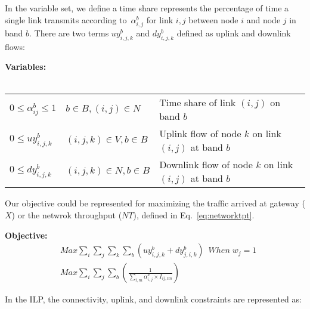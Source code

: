 In the variable set, we define a time share represents 
the percentage of time a single link transmits according 
to~$\alpha_{i,j}^b$ for link $i,j$ between node $i$ and 
node $j$ in band $b$. There are two terms $uy_{i,j,k}^{b}$
and $dy_{i,j,k}^{b}$ defined as uplink and downlink flows:

\noindent
{\bf Variables:}\\
\\
\begin{tabular}{llp{3cm}}
$0\le \alpha_{ij}^b \le 1$  & $b\in B, (i,j) \in N$ & 
Time share of link $(i,j)$ on band $b$\\ 
$0\le uy_{i,j,k}^b$ & $(i,j,k) \in V, b \in B$ & 
Uplink flow of node $k$ on link $(i,j)$ at band $b$ \\ 
$0\le dy_{i,j,k}^b$ & $(i,j,k) \in N, b \in B$ & 
Downlink flow of node $k$ on link $(i,j)$ at band $b$ \\ 
\end{tabular}

Our objective could be represented for  
maximizing the traffic arrived at gateway ($X$)
or the netwrok throughput ($NT$), defined in 
Eq.~\ref{eq:networktpt}.

\noindent
{\bf Objective:}
\begin{align}
& Max \sum_i\sum_j\sum_k\sum_b(uy_{i,j,k}^b+dy_{j,i,k}^b) \;\ When \; w_j=1 \\
& Max \sum_i\sum_j\sum_b(\frac{1}{\sum_{l,m}\alpha_{i,j}^b\times I_{ij,lm}})
\end{align}

In the ILP, the connectivity, uplink, and downlink constraints are represented
as:  

